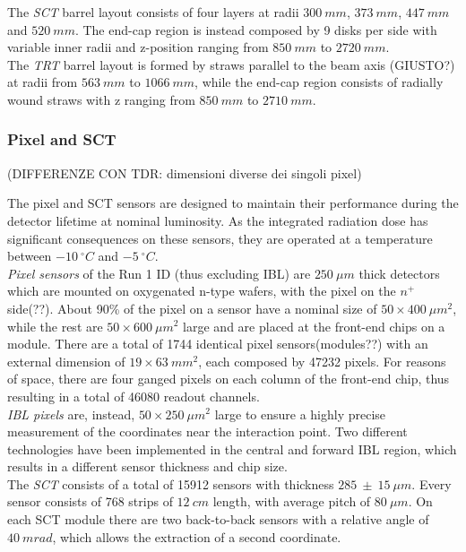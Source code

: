 \documentclass[a4paper,twoside,12pt]{article}
\begin{document}
The \textit{SCT} barrel layout consists of four layers at radii $300\ mm$, $373\ mm$, $447\ mm$ and $520\ mm$. The end-cap region is instead composed by 9 disks per side with variable
inner radii and z-position ranging from $850\ mm$ to $2720\ mm$. \\

The \textit{TRT} barrel layout is formed by straws parallel to the beam axis (GIUSTO?) at radii from $563\ mm$ to $1066\ mm$,
while the end-cap region consists of radially wound straws with z ranging from $850\ mm$ to 
$2710\ mm$. 

\subsubsection*{Pixel and SCT} (DIFFERENZE CON TDR: dimensioni diverse dei singoli pixel)

The pixel and SCT sensors are designed to maintain their performance during the detector
lifetime at nominal luminosity\cite{Aad:2008zzm}. As the integrated radiation dose has significant consequences
on these sensors, they are operated at a temperature between $-10\ ^{\circ}C$ and $-5\ ^{\circ}C$.\\

\textit{Pixel sensors} of the Run 1 ID (thus excluding IBL) are $250\ \mu m$ thick detectors which are mounted on oxygenated n-type wafers, with the pixel on the $n^+$ side(??). About 90\% of the pixel on a sensor have a nominal 
size of $50 \times 400\ \mu m^2$, while the rest are $50 \times 600\ \mu m^2$ large and are placed
at the front-end chips on a module. There are a total of 1744 identical pixel sensors(modules??) with an external dimension of $19 \times 63\ mm^2$, each composed by 47232 pixels. For reasons of space, there are four ganged pixels on each column of the front-end chip, thus resulting in a total of 46080 readout channels. \\

\textit{IBL pixels} are, instead, $50 \times 250\ \mu m^2$ large to 
ensure a highly precise measurement of the coordinates near the interaction point\cite{IBL}. Two 
different technologies have been implemented in the central and forward IBL region, which
results in a different sensor thickness and chip size.\\

The \textit{SCT} consists of a total of 15912 sensors with thickness $285\ \pm\ 15\ \mu m$. Every sensor consists of 768 strips of $12\ cm$ length, with average pitch of $80\ \mu m$.
On each SCT module there are two back-to-back sensors with a relative angle of $40\ mrad$,
which allows the extraction of a second coordinate.
\end{document}
